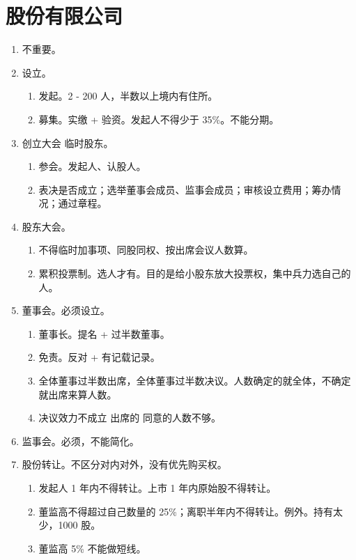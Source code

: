 \section{股份有限公司}
\begin{enumerate}
  \item 不重要。
  \item 设立。
        \begin{enumerate}
          \item 发起。2 - 200 人，半数以上境内有住所。
          \item 募集。实缴 + 验资。发起人不得少于 35\%。不能分期。
        \end{enumerate}
  \item 创立大会 \ydy 临时股东。
        \begin{enumerate}
          \item 参会。发起人、认股人。
          \item 表决是否成立；选举董事会成员、监事会成员；审核设立费用；筹办情况；通过章程。
        \end{enumerate}
  \item 股东大会。
        \begin{enumerate}
          \item 不得临时加事项、同股同权、按出席会议人数算。
          \item 累积投票制。选人才有。目的是给小股东放大投票权，集中兵力选自己的人。
        \end{enumerate}
  \item 董事会。必须设立。
        \begin{enumerate}
          \item 董事长。提名 + 过半数董事。
          \item 免责。反对 + 有记载记录。
          \item 全体董事过半数出席，全体董事过半数决议。人数确定的就全体，不确定就出席来算人数。
          \item 决议效力不成立 \yjt 出席的 \hz 同意的人数不够。
        \end{enumerate}
  \item 监事会。必须，不能简化。
  \item 股份转让。不区分对内对外，没有优先购买权。
        \begin{enumerate}
          \item 发起人 1 年内不得转让。上市 1 年内原始股不得转让。
          \item 董监高不得超过自己数量的 25\%；离职半年内不得转让。例外。持有太少，1000 股。
          \item 董监高 5\% 不能做短线。

\end{enumerate}
\end{enumerate}
